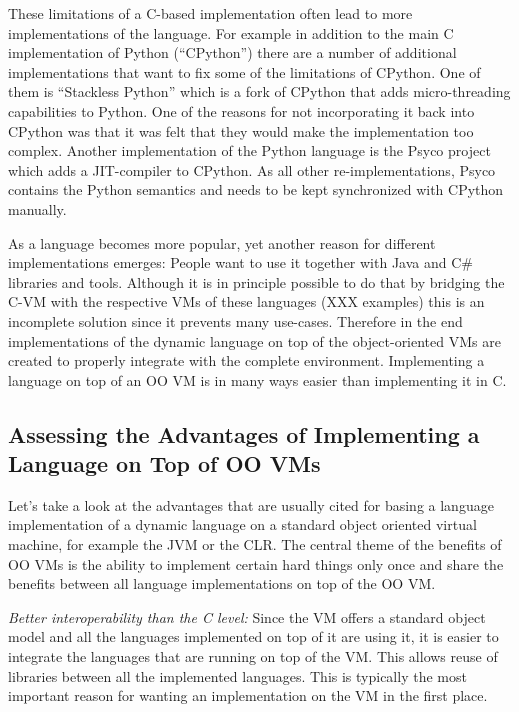 \documentclass{llncs}
\begin{document}


These limitations of a C-based implementation often lead to more
implementations of the language. For example in addition to the main C
implementation of Python (``CPython'') there are a number of additional
implementations that want to fix some of the limitations of CPython. One of
them is ``Stackless Python'' which is a fork of CPython that adds micro-threading
capabilities to Python. One of the reasons for not incorporating it back into
CPython was that it was felt that they would make the implementation too
complex. Another implementation of the Python language is the Psyco project
which adds a JIT-compiler to CPython. As all other re-implementations, Psyco
contains the Python semantics and needs to be kept synchronized with CPython
manually.


As a language becomes more popular, yet another reason for different
implementations emerges: People want to use it together with Java and C\#
libraries and tools. Although it is in principle possible to do that by
bridging the C-VM with the respective VMs of these languages (XXX examples)
this is an incomplete solution since it prevents many use-cases.
Therefore in the end implementations of the dynamic language on top of the
object-oriented VMs are created to properly integrate with the complete
environment. Implementing a language on top of an OO VM is in many ways easier
than implementing it in C.


\subsection{Assessing the Advantages of Implementing a Language on Top of OO
VMs}

Let's take a look at the advantages that are usually cited for basing a
language implementation of a dynamic language on a standard object oriented
virtual machine, for example the JVM or the CLR. The central theme of the
benefits  of OO VMs is the ability to implement certain hard things only once
and share the benefits between all language implementations on top of the OO VM.

\emph{Better interoperability than the C level:} Since the VM offers a standard
object model and all the languages implemented on top of it are using it, it is
easier to integrate the languages that are running on top of the VM. This
allows reuse of libraries between all the implemented languages. This is
typically the most important reason for wanting an implementation on the VM in
the first place.
\end{document}
